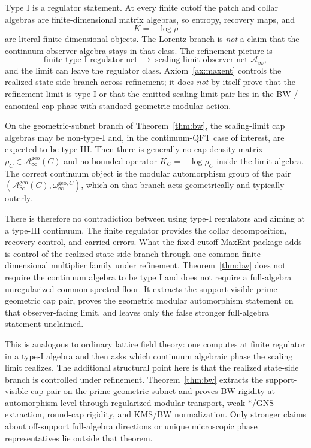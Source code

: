 \documentclass[11pt]{article}
\begin{document}
Type I is a regulator statement. At every finite cutoff the patch and collar algebras are finite-dimensional matrix algebras, so entropy, recovery maps, and
\[
K=-\log\rho
\]
are literal finite-dimensional objects. The Lorentz branch is \emph{not} a claim that the continuum observer algebra stays in that class. The refinement picture is
\[
\text{finite type-I regulator net}
\;\longrightarrow\;
\text{scaling-limit observer net } \mathcal A_\infty,
\]
and the limit can leave the regulator class. Axiom~\ref{ax:maxent} controls the realized state-side branch across refinement; it does \emph{not} by itself prove that the refinement limit is type I or that the emitted scaling-limit pair lies in the BW / canonical cap phase with standard geometric modular action.

On the geometric-subnet branch of Theorem~\ref{thm:bw}, the scaling-limit cap algebras may be non-type-I and, in the continuum-QFT case of interest, are expected to be type III. Then there is generally no cap density matrix \(\rho_C\in \mathcal A_\infty^{\mathrm{geo}}(C)\) and no bounded operator \(K_C=-\log\rho_C\) inside the limit algebra. The correct continuum object is the modular automorphism group of the pair \((\mathcal A_\infty^{\mathrm{geo}}(C),\omega_\infty^{\mathrm{geo},C})\), which on that branch acts geometrically and typically outerly.

There is therefore no contradiction between using type-I regulators and aiming at a type-III continuum. The finite regulator provides the collar decomposition, recovery control, and carried errors. What the fixed-cutoff MaxEnt package adds is control of the realized state-side branch through one common finite-dimensional multiplier family under refinement. Theorem~\ref{thm:bw} does not require the continuum algebra to be type I and does not require a full-algebra unregularized common spectral floor. It extracts the support-visible prime geometric cap pair, proves the geometric modular automorphism statement on that observer-facing limit, and leaves only the false stronger full-algebra statement unclaimed.

This is analogous to ordinary lattice field theory: one computes at finite regulator in a type-I algebra and then asks which continuum algebraic phase the scaling limit realizes. The additional structural point here is that the realized state-side branch is controlled under refinement. Theorem~\ref{thm:bw} extracts the support-visible cap pair on the prime geometric subnet and proves BW rigidity at automorphism level through regularized modular transport, weak-\(*\)/GNS extraction, round-cap rigidity, and KMS/BW normalization. Only stronger claims about off-support full-algebra directions or unique microscopic phase representatives lie outside that theorem.
\end{document}
